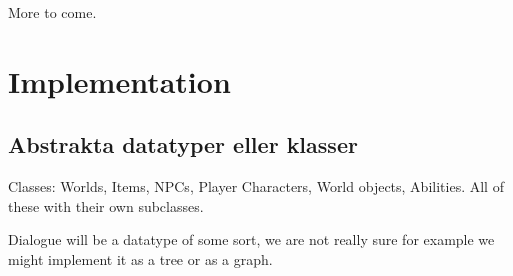 \documentclass[12pt,a4paper]{article}
\begin{document}
\bigskip

More to come.

\section{Implementation}

\subsection{Abstrakta datatyper eller klasser}

Classes: Worlds, Items, NPCs, Player Characters, World objects, Abilities. All of these with their own subclasses.

Dialogue will be a datatype of some sort, we are not really sure for example we might implement it as a tree or as a graph.


\end{document}
